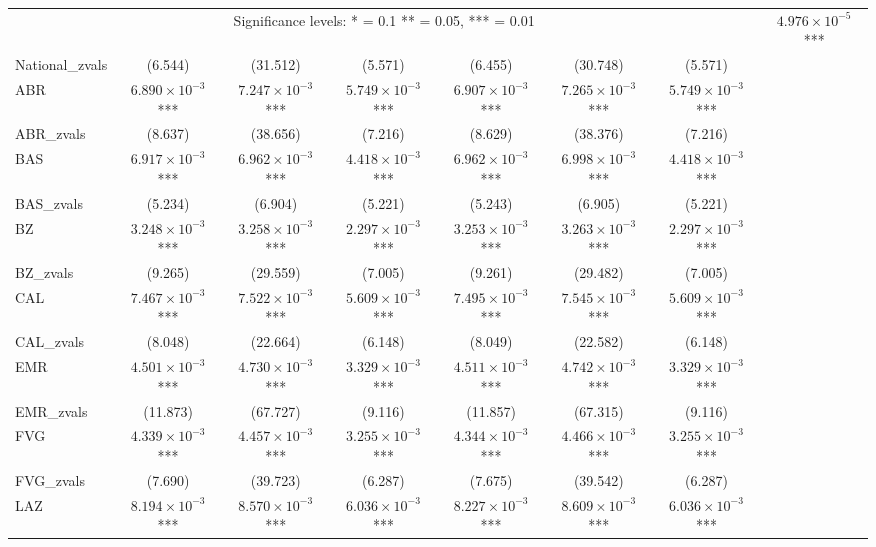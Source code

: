 \documentclass[12pt]{article}
\begin{document}
\begin{appendices}
\begin{landscape}
\begin{longtable}{@{}lccccccc@{}}
    		\multicolumn{7}{c}{Significance levels: * = 0.1 ** = 0.05, *** = 0.01}
    		\endlastfoot
            National & $4.976 \times 10^{-5}$*** & 0.011*** & $3.626 \times 10^{-5}$*** & $5.039 \times 10^{-5}$*** & $1.142 \times 10^{-3}$*** & $3.626 \times 10^{-5}$*** \\  
            National\_zvals & (6.544) & (31.512) & (5.571) & (6.455) & (30.748) & (5.571) \\ 
            ABR & $6.890 \times 10^{-3}$*** & $7.247 \times 10^{-3}$*** & $5.749 \times 10^{-3}$*** & $6.907 \times 10^{-3}$*** & $7.265 \times 10^{-3}$*** & $5.749 \times 10^{-3}$*** \\ 
            ABR\_zvals & (8.637) & (38.656) & (7.216) & (8.629) & (38.376) & (7.216) \\ 
            BAS & $6.917 \times 10^{-3}$*** & $6.962 \times 10^{-3}$*** & $4.418 \times 10^{-3}$*** & $6.962 \times 10^{-3}$*** & $6.998 \times 10^{-3}$*** & $4.418 \times 10^{-3}$*** \\ 
            BAS\_zvals & (5.234) & (6.904) & (5.221) & (5.243) & (6.905) & (5.221) \\ 
            BZ & $3.248 \times 10^{-3}$*** & $3.258 \times 10^{-3}$*** & $2.297 \times 10^{-3}$***  & $3.253 \times 10^{-3}$*** & $3.263 \times 10^{-3}$*** & $2.297 \times 10^{-3}$*** \\ 
            BZ\_zvals & (9.265) & (29.559) & (7.005) & (9.261) & (29.482) & (7.005) \\ 
            CAL & $7.467 \times 10^{-3}$*** & $7.522 \times 10^{-3}$*** & $5.609 \times 10^{-3}$*** & $7.495 \times 10^{-3}$*** & $7.545 \times 10^{-3}$*** & $5.609 \times 10^{-3}$*** \\ 
            CAL\_zvals & (8.048) & (22.664) & (6.148) & (8.049) & (22.582) & (6.148) \\ 
            EMR & $4.501 \times 10^{-3}$*** & $4.730 \times 10^{-3}$*** & $3.329 \times 10^{-3}$*** & $4.511 \times 10^{-3}$*** & $4.742 \times 10^{-3}$*** & $3.329 \times 10^{-3}$*** \\  
            EMR\_zvals & (11.873) & (67.727) & (9.116) & (11.857) & (67.315) & (9.116) \\ 
            FVG & $4.339 \times 10^{-3}$*** & $4.457 \times 10^{-3}$*** & $3.255 \times 10^{-3}$*** & $4.344 \times 10^{-3}$*** & $4.466 \times 10^{-3}$*** & $3.255 \times 10^{-3}$*** \\ 
            FVG\_zvals & (7.690) & (39.723) & (6.287) & (7.675) & (39.542) & (6.287) \\ 
            LAZ & $8.194 \times 10^{-3}$*** & $8.570 \times 10^{-3}$*** & $6.036 \times 10^{-3}$*** & $8.227 \times 10^{-3}$*** & $8.609 \times 10^{-3}$*** & $6.036 \times 10^{-3}$*** \\ 

\end{longtable}
\end{landscape}
\end{appendices}
\end{document}
